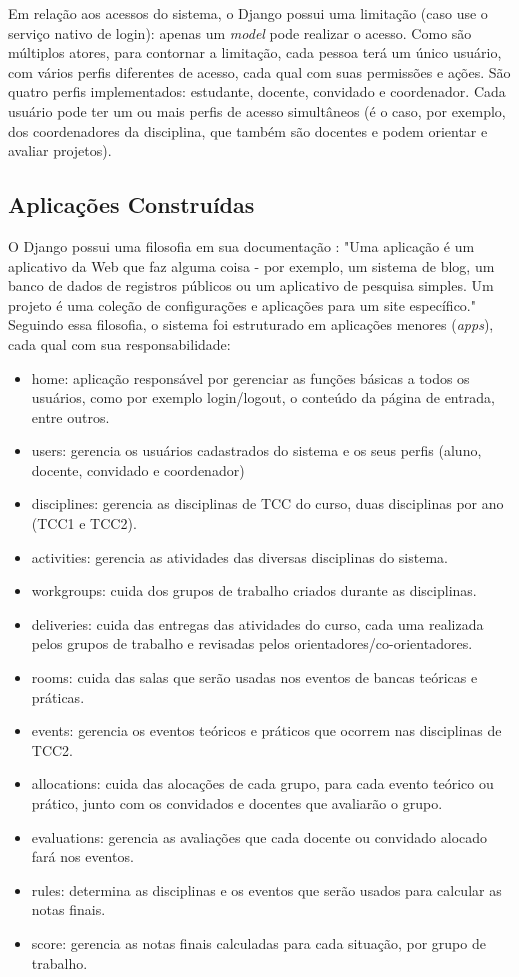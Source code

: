 Em relação aos acessos do sistema, o Django possui uma limitação (caso use o serviço nativo de login): apenas um \textit{model} pode realizar o acesso. Como são múltiplos atores, para contornar a limitação, cada pessoa terá um único usuário, com vários perfis diferentes de acesso, cada qual com suas permissões e ações. São quatro perfis implementados: estudante, docente, convidado e coordenador. Cada usuário pode ter um ou mais perfis de acesso simultâneos (é o caso, por exemplo, dos coordenadores da disciplina, que também são docentes e podem orientar e avaliar projetos).

\subsection{Aplicações Construídas}
O Django possui uma filosofia em sua documentação \cite{djangodocs}: "Uma aplicação é um aplicativo da Web que faz alguma coisa - por exemplo, um sistema de blog, um banco de dados de registros públicos ou um aplicativo de pesquisa simples. Um projeto é uma coleção de configurações e aplicações para um site específico." Seguindo essa filosofia, o sistema foi estruturado em aplicações menores (\textit{apps}), cada qual com sua responsabilidade:

\begin{itemize}
    \item home: aplicação responsável por gerenciar as funções básicas a todos os usuários, como por exemplo login/logout, o conteúdo da página de entrada, entre outros.
    \item users: gerencia os usuários cadastrados do sistema e os seus perfis (aluno, docente, convidado e coordenador)
    \item disciplines: gerencia as disciplinas de TCC do curso, duas disciplinas por ano (TCC1 e TCC2).
    \item activities: gerencia as atividades das diversas disciplinas do sistema.
    \item workgroups: cuida dos grupos de trabalho criados durante as disciplinas. 
    \item deliveries: cuida das entregas das atividades do curso, cada uma realizada pelos grupos de trabalho e revisadas pelos orientadores/co-orientadores.
    \item rooms: cuida das salas que serão usadas nos eventos de bancas teóricas e práticas.
    \item events: gerencia os eventos teóricos e práticos que ocorrem nas disciplinas de TCC2.
    \item allocations: cuida das alocações de cada grupo, para cada evento teórico ou prático, junto com os convidados e docentes que avaliarão o grupo.
    \item evaluations: gerencia as avaliações que cada docente ou convidado alocado fará nos eventos.
    \item rules: determina as disciplinas e os eventos que serão usados para calcular as notas finais.
    \item score: gerencia as notas finais calculadas para cada situação, por grupo de trabalho.
\end{itemize}

